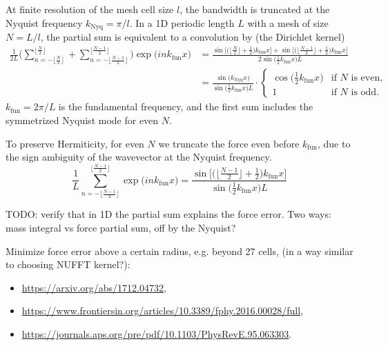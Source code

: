 \documentclass[a4paper]{article}
\newcommand{\1}{\mathds{1}}
\newcommand{\knyq}{k_\mathrm{Nyq}}
\newcommand{\kfun}{k_\mathrm{fun}}
\newcommand{\YL}[1]{\textcolor{Bittersweet}{#1}}
\begin{document}
At finite resolution of the mesh cell size $l$, the bandwidth is
truncated at the Nyquist frequency $\knyq = \pi / l$.
In a 1D periodic length $L$ with a mesh of size $N = L / l$, the
partial sum is equivalent to a convolution by (the Dirichlet kernel)
%
\begin{align}
\frac1{2 L} \Bigg(
  \sum_{n=-\lfloor \frac{N}2\rfloor}^{\lfloor \frac{N}2\rfloor}
  + \sum_{n=-\lfloor \frac{N-1}2\rfloor}^{\lfloor \frac{N-1}2\rfloor}
\Bigg)
\exp\bigl( i n\kfun x \bigr)
%
&= \frac{
  \sin \bigl[
    \bigl( \bigl\lfloor\frac{N}2\bigr\rfloor + \frac12 \bigr) \kfun x
  \bigr]
  + \sin \bigl[
    \bigl( \bigl\lfloor\frac{N-1}2\bigr\rfloor + \frac12 \bigr) \kfun x
  \bigr]
}{2 \sin \bigl( \frac12 \kfun x \bigr) L} \nonumber\\
%
&= \frac{\sin \bigl( \knyq x \bigr)}
        {\sin \bigl( \frac12 \kfun x \bigr) L}
  \cdot \begin{cases}
    \cos \bigl( \frac12 \kfun x \bigr) & \text{if } N \text{ is even}, \\
    1 & \text{if } N \text{ is odd}.
  \end{cases}
\end{align}
%
$\kfun = 2\pi / L$ is the fundamental frequency, and the first sum
includes the symmetrized Nyquist mode for even $N$.

To preserve Hermiticity, for even $N$ we truncate the force even before
$\kfun$, due to the sign ambiguity of the wavevector at the Nyquist
frequency.
%
\begin{equation}
\frac1L
  \sum_{n=-\lfloor \frac{N-1}2\rfloor}^{\lfloor \frac{N-1}2\rfloor}
  \exp\bigl( i n\kfun x \bigr)
%
= \frac{\sin \bigl[
    \bigl( \bigl\lfloor\frac{N-1}2\bigr\rfloor + \frac12 \bigr) \kfun x
  \bigr]
}{\sin \bigl( \frac12 \kfun x \bigr) L}
\end{equation}


\YL{TODO: verify that in 1D the partial sum explains the force error.
Two ways: mass integral vs force partial sum, off by the Nyquist?}


\YL{Minimize force error above a certain radius, e.g. beyond 27 cells,
(in a way similar to choosing NUFFT kernel?):
\begin{itemize}
\item \url{https://arxiv.org/abs/1712.04732},
\item \url{https://www.frontiersin.org/articles/10.3389/fphy.2016.00028/full},
\item \url{https://journals.aps.org/pre/pdf/10.1103/PhysRevE.95.063303}.
\end{itemize}
}
\end{document}
